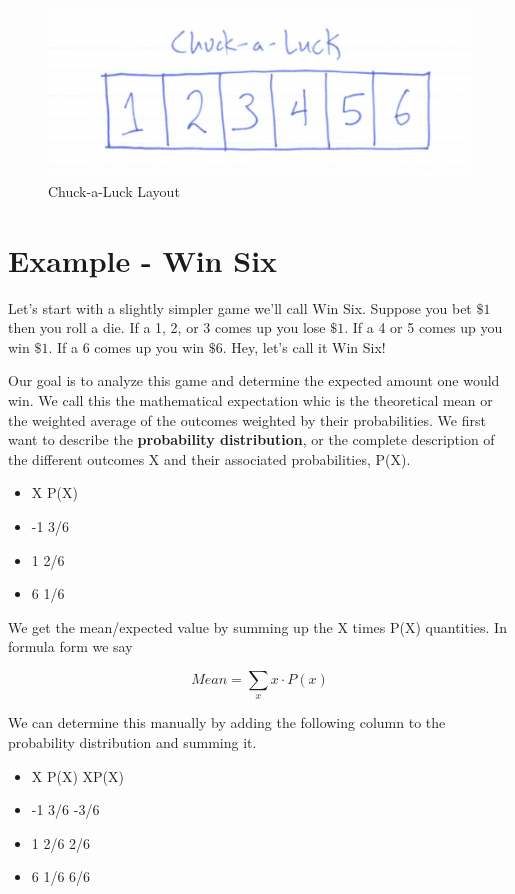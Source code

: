 \documentclass[]{book}
\providecommand{\tightlist}{%
  \setlength{\itemsep}{0pt}\setlength{\parskip}{0pt}}
\theoremstyle{definition}
\theoremstyle{definition}
\theoremstyle{definition}
\theoremstyle{remark}
\begin{document}
\begin{figure}

{\centering \includegraphics[width=0.3\linewidth]{01-basics-figures/chuck_a_luck_layout} 

}

\caption{Chuck-a-Luck Layout}\label{fig:nice-fig-81}
\end{figure}

\section{Example - Win Six}\label{example---win-six}

Let's start with a slightly simpler game we'll call Win Six. Suppose you
bet \(\$1\) then you roll a die. If a 1, 2, or 3 comes up you lose
\(\$1\). If a 4 or 5 comes up you win \(\$1\). If a 6 comes up you win
\(\$6\). Hey, let's call it Win Six!

Our goal is to analyze this game and determine the expected amount one
would win. We call this the mathematical expectation whic is the
theoretical mean or the weighted average of the outcomes weighted by
their probabilities. We first want to describe the \textbf{probability
distribution}, or the complete description of the different outcomes X
and their associated probabilities, P(X).

\begin{itemize}
\tightlist
\item
  X P(X)
\item
  -1 3/6
\item
  1 2/6
\item
  6 1/6
\end{itemize}

We get the mean/expected value by summing up the X times P(X)
quantities. In formula form we say

\[Mean = \sum_{x} x \cdot P(x)\]

We can determine this manually by adding the following column to the
probability distribution and summing it.

\begin{itemize}
\tightlist
\item
  X P(X) XP(X)
\item
  -1 3/6 -3/6
\item
  1 2/6 2/6
\item
  6 1/6 6/6
\end{itemize}
\end{document}
